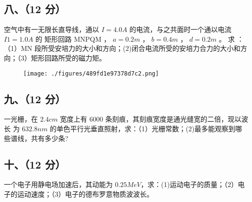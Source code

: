 \subsection{八、（12 分）}
空气中有一无限长直导线，通以 $I=4.0A$ 的电流，与之共面时一个通以电流 $I1=1.0A$ 的 矩形回路 MNPQM ， $a=0.2m$ ， $b=0.4m$ ， $d=0.2m$ 。 求 ：（1）MN 段所受安培力的大小和方向；(2)闭合电流所受的安培力合力的大小和方向；（3）矩形回路所受的磁力矩。
\begin{figure}[ht]
\centering
\texttt{[image: ./figures/489fd1e97378d7c2.png]}
\caption{} \label{fig_NJUB07_4}
\end{figure}
\subsection{九、（12 分）}
一光栅，在 $2.4cm$ 宽度上有 6000 条刻痕，其刻痕宽度是通光缝宽的二倍，现以波长 为 $632.8nm$ 的单色平行光垂直照射，求：（1）光栅常数；(2)最多能观察到哪些谱线，共有多少条?
\subsection{十、（12 分）}
一个电子用静电场加速后，其动能为 $0.25MeV$，求：(1)运动电子的质量；（2）电子的运动速度；（3）电子的德布罗意物质波波长。